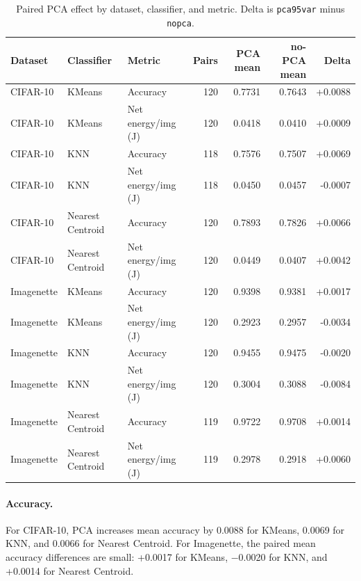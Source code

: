 \documentclass[sigconf,review,nonacm]{acmart}
\begin{document}
\begin{table}[t]
  \caption{Paired PCA effect by dataset, classifier, and metric. Delta is \texttt{pca95var} minus \texttt{nopca}.}
  \label{tab:pca-effect}
  \centering
  \footnotesize
  \begin{tabular}{@{}lllrrrr@{}}
    \toprule
    Dataset & Classifier & Metric & Pairs & PCA mean & no-PCA mean & Delta \\
    \midrule
    CIFAR-10 & KMeans & Accuracy & 120 & 0.7731 & 0.7643 & +0.0088 \\
    CIFAR-10 & KMeans & Net energy/img (J) & 120 & 0.0418 & 0.0410 & +0.0009 \\
    CIFAR-10 & KNN & Accuracy & 118 & 0.7576 & 0.7507 & +0.0069 \\
    CIFAR-10 & KNN & Net energy/img (J) & 118 & 0.0450 & 0.0457 & -0.0007 \\
    CIFAR-10 & Nearest Centroid & Accuracy & 120 & 0.7893 & 0.7826 & +0.0066 \\
    CIFAR-10 & Nearest Centroid & Net energy/img (J) & 120 & 0.0449 & 0.0407 & +0.0042 \\
    Imagenette & KMeans & Accuracy & 120 & 0.9398 & 0.9381 & +0.0017 \\
    Imagenette & KMeans & Net energy/img (J) & 120 & 0.2923 & 0.2957 & -0.0034 \\
    Imagenette & KNN & Accuracy & 120 & 0.9455 & 0.9475 & -0.0020 \\
    Imagenette & KNN & Net energy/img (J) & 120 & 0.3004 & 0.3088 & -0.0084 \\
    Imagenette & Nearest Centroid & Accuracy & 119 & 0.9722 & 0.9708 & +0.0014 \\
    Imagenette & Nearest Centroid & Net energy/img (J) & 119 & 0.2978 & 0.2918 & +0.0060 \\
    \bottomrule
  \end{tabular}
\end{table}

\paragraph{Accuracy.}
For CIFAR-10, PCA increases mean accuracy by 0.0088 for KMeans, 0.0069 for KNN, and 0.0066 for Nearest Centroid.
For Imagenette, the paired mean accuracy differences are small: +0.0017 for KMeans, $-$0.0020 for KNN, and +0.0014 for Nearest Centroid.
\end{document}
